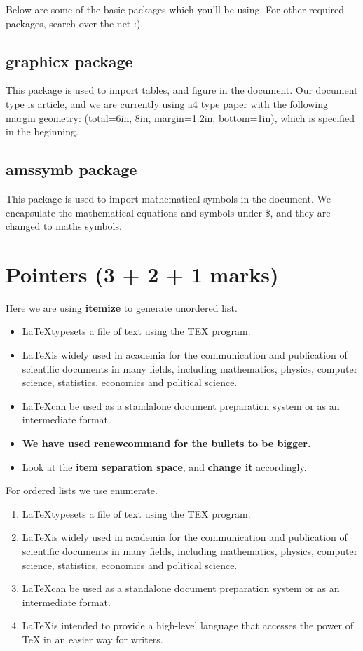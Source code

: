 \documentclass[12pt]{article}
\newcommand{\LATEX}{\LaTeX}
\begin{document}
Below are some of the basic packages which you’ll be using. For other
required packages, search over the net :).
\par


\subsection {graphicx package}
This package is used to import tables, and figure in the document. Our
document type is article, and we are currently using a4 type paper with the
following margin geometry: (total={6in, 8in}, margin=1.2in, bottom=1in),
which is specified in the beginning.

\subsection {amssymb package}
This package is used to import mathematical symbols in the document. We
encapsulate the mathematical equations and symbols under \$, and they are
changed to maths symbols.
 
\section{Pointers (3 + 2 + 1 marks)}
Here we are using \textbf{itemize} to generate unordered list.
\renewcommand\labelitemi{\large$\bullet$} %
\begin{itemize}
 
 \setlength\itemsep{1em}
	\item \LATEX typesets a file of text using the TEX program.
	\item \LATEX is widely used in academia for the communication and publication of scientific documents in many fields, including mathematics, physics, computer science, statistics, economics and political science.
	\item \LATEX can be used as a standalone document preparation system or as an intermediate format.
	\item \textbf{We have used renewcommand for the bullets to be bigger.}
	\item Look at the \textbf{item separation space}, and \textbf{change it} accordingly.
\end{itemize}

For ordered lists we use enumerate.

\begin{enumerate}[label=\Roman*]
\item \LATEX typesets a file of text using the TEX program.
\item \LATEX is widely used in academia for the communication and publication
of scientific documents in many fields, including mathematics, physics,
computer science, statistics, economics and political science.
\item \LaTeX can be used as a standalone document preparation system or as an
intermediate format.
\item \LATEX is intended to provide a high-level language that accesses the power
of TeX in an easier way for writers.

\end{enumerate}
\end{document}
